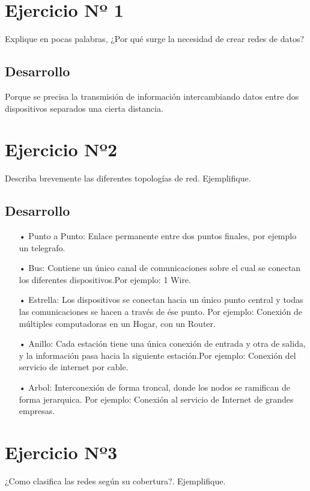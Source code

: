 \documentclass[12pt,letterpaper]{article}
\author{}
\date{}
\begin{document}




\section{Ejercicio Nº 1}
Explique en pocas palabras, ¿Por qué surge la necesidad de crear redes de datos?
\subsection{Desarrollo}
Porque se precisa la transmisión de información intercambiando datos entre dos dispositivos separados una cierta distancia.

\section{Ejercicio Nº2}
Describa brevemente las diferentes topologías de red. Ejemplifique.
\subsection{Desarrollo}
\begin{enumerate}
\item[•]Punto a Punto: Enlace permanente entre dos puntos finales, por ejemplo un telegrafo.
\item[•]Bus: Contiene un único canal de comunicaciones sobre el cual se conectan los diferentes dispositivos.Por ejemplo: 1 Wire.
\item[•]Estrella: Los dispositivos se conectan hacia un único punto central y todas las comunicaciones se hacen a través de ése punto. Por ejemplo: Conexión de múltiples computadoras en un Hogar, con un Router.
\item[•]Anillo: Cada estación tiene una única conexión de entrada y otra de salida, y la información pasa hacia la siguiente estación.Por ejemplo: Conexión del servicio de internet por cable. 
\item[•]Arbol: Interconexión de forma troncal, donde los nodos se ramifican de forma jerarquica. Por ejemplo: Conexión al servicio de Internet de grandes empresas.
\end{enumerate}

\section{Ejercicio Nº3}
¿Como clasifica las redes según su cobertura?. Ejemplifique.
\end{document}
